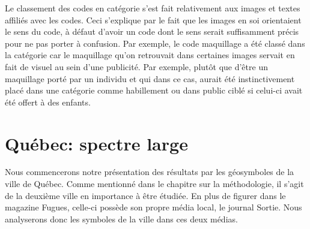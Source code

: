 Le classement des codes en catégorie s'est fait relativement aux images et textes affiliés avec les codes. Ceci s'explique par le fait que les images en soi orientaient le sens du code, à défaut d'avoir un code dont le sens serait suffisamment précis pour ne pas porter à confusion. 
Par exemple, le code maquillage a été classé dans la catégorie  car le maquillage qu'on retrouvait dans certaines images servait en fait de visuel au sein d'une publicité. Par exemple, plutôt que d'être un maquillage porté par un individu et qui dans ce cas, aurait été instinctivement placé dans une catégorie comme habillement ou dans public ciblé si celui-ci avait été offert à des enfants.

\section{Québec: spectre large}
\label{sec:qu_bec_spectre_large}
Nous commencerons notre présentation des résultats par les géosymboles de la ville de Québec. 
Comme mentionné dans le chapitre sur la méthodologie, il s'agit de la deuxième ville en importance à être étudiée. 
En plus de figurer dans le magazine Fugues, celle-ci possède son propre média local, le journal Sortie. 
Nous analyserons donc les symboles de la ville dans ces deux médias.

